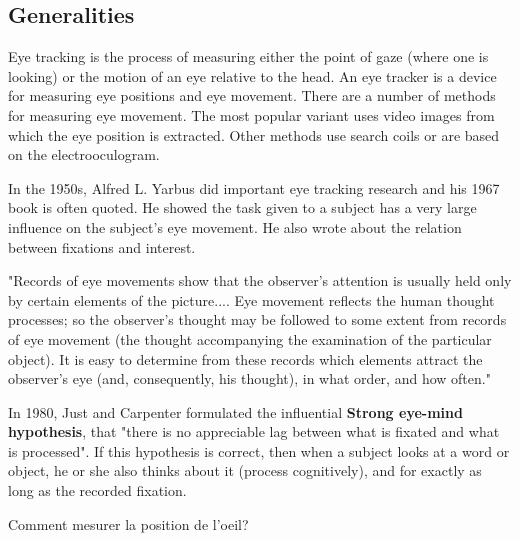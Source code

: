 \subsection{Generalities}

Eye tracking is the process of measuring either the point of gaze (where one is looking) or the motion of an eye relative to the head. An eye tracker is a device for measuring eye positions and eye movement. There are a number of methods for measuring eye movement. The most popular variant uses video images from which the eye position is extracted. Other methods use search coils or are based on the electrooculogram.

In the 1950s, Alfred L. Yarbus did important eye tracking research and his 1967 book is often quoted. He showed the task given to a subject has a very large influence on the subject's eye movement. He also wrote about the relation between fixations and interest.

"Records of eye movements show that the observer's attention is usually held only by certain elements of the picture.... Eye movement reflects the human thought processes; so the observer's thought may be followed to some extent from records of eye movement (the thought accompanying the examination of the particular object). It is easy to determine from these records which elements attract the observer's eye (and, consequently, his thought), in what order, and how often."

In 1980, Just and Carpenter formulated the influential \textbf{Strong eye-mind hypothesis}, that "there is no appreciable lag between what is fixated and what is processed". If this hypothesis is correct, then when a subject looks at a word or object, he or she also thinks about it (process cognitively), and for exactly as long as the recorded fixation. 

Comment mesurer la position de l'oeil?

